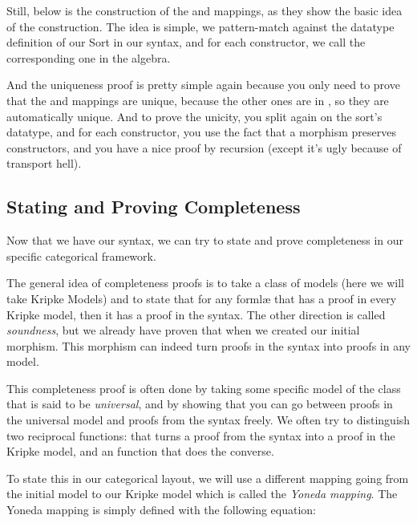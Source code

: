 \documentclass[10pt,a4paper]{article}
\begin{document}
			Still, below is the construction of the  and  mappings, as they show the basic idea of the construction. The idea is simple, we pattern-match against the datatype definition of our Sort in our syntax, and for each constructor, we call the corresponding one in the algebra.
			
			And the uniqueness proof is pretty simple again because you only need to prove that the  and  mappings are unique, because the other ones are in , so they are automatically unique. And to prove the unicity, you split again on the sort's datatype, and for each constructor, you use the fact that a morphism preserves constructors, and you have a nice proof by recursion (except it's ugly because of transport hell).
			
			\begin{tcolorbox}
			\end{tcolorbox}
				
		\subsection{Stating and Proving Completeness}
		
			Now that we have our syntax, we can try to state and prove completeness in our specific categorical framework.
			
			The general idea of completeness proofs is to take a class of models (here we will take Kripke Models) and to state that for any formlæ that has a proof in every Kripke model, then it has a proof in the syntax. The other direction is called \emph{soundness}, but we already have proven that when we created our initial morphism. This morphism can indeed turn proofs in the syntax into proofs in any model.
			
			This completeness proof is often done by taking some specific model of the class that is said to be \emph{universal}, and by showing that you can go between proofs in the universal model and proofs from the syntax freely. We often try to distinguish two reciprocal functions:  that turns a proof from the syntax into a proof in the Kripke model, and an  function that does the converse.
			
			To state this in our categorical layout, we will use a different mapping going from the initial model to our Kripke model which is called the \emph{Yoneda mapping}. The Yoneda mapping is simply defined with the following equation:
			
\end{document}
